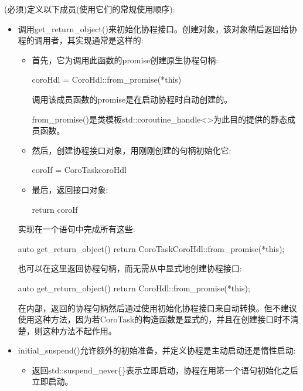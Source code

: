 (必须)定义以下成员(使用它们的常规使用顺序):

\begin{itemize}
\item
调用get\_return\_object()来初始化协程接口。创建对象，该对象稍后返回给协程的调用者，其实现通常是这样的:
\begin{itemize}
\item
首先，它为调用此函数的promise创建原生协程句柄:

\begin{cpp}
coroHdl = CoroHdl::from_promise(*this)
\end{cpp}

调用该成员函数的promise是在启动协程时自动创建的。

from\_promise()是类模板std::coroutine\_handle<>为此目的提供的静态成员函数。

\item
然后，创建协程接口对象，用刚刚创建的句柄初始化它:

\begin{cpp}
coroIf = CoroTask{coroHdl}
\end{cpp}

\item
最后，返回接口对象:

\begin{cpp}
return coroIf
\end{cpp}

\end{itemize}

实现在一个语句中完成所有这些:

\begin{cpp}
auto get_return_object() {
	return CoroTask{CoroHdl::from_promise(*this)};
}
\end{cpp}

也可以在这里返回协程句柄，而无需从中显式地创建协程接口:

\begin{cpp}
auto get_return_object() {
	return CoroHdl::from_promise(*this);
}
\end{cpp}

在内部，返回的协程句柄然后通过使用初始化协程接口来自动转换。但不建议使用这种方法，因为若CoroTask的构造函数是显式的，并且在创建接口时不清楚，则这种方法不起作用。

\item
initial\_suspend()允许额外的初始准备，并定义协程是主动启动还是惰性启动:

\begin{itemize}
\item
返回std::suspend\_never\{\}表示立即启动，协程在用第一个语句初始化之后立即启动。


\end{itemize}
\end{itemize}
